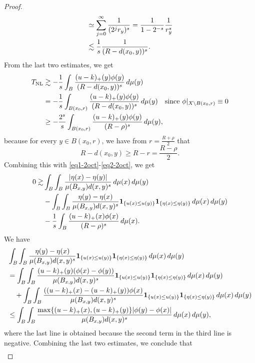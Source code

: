 \documentclass[11pt,leqno]{amsart}
\numberwithin{equation}{section}
\theoremstyle{definition}
\begin{document}
\begin{proof}
\begin{align}
			&\simeq   \sum_{j=0}^\infty \frac{1}{(2^j r_y)^s}= \frac{1}{1-2^{-s}}\frac{1}{r_y^s}\notag\\
			& \lesssim \frac{1}{s}\frac{1}{(R-d(x_0,y))^s}.
		\end{align}
		From the last two estimates, we get
		\begin{align}
			T_{\rm NL}
			&\gtrsim  - \frac{1}{s}\int_{B} \frac{(u-k)_+(y)\phi(y)}{(R-d(x_0,y))^s}\,d\mu(y) \notag\\ 
			&=  - \frac{1}{s}\int_{B(x_0,r)} \frac{(u-k)_+(y)\phi(y)}{(R-d(x_0,y))^s}\,d\mu(y)
			\quad\textrm{since $\phi|_{X\setminus B(x_0,r)}\equiv 0$} \notag\\ 
			& \geq - \frac{2^s}{s}\int_{B(x_0,r)} \frac{(u-k)_+(y)\phi(y)}{(R-\rho)^s}\,d\mu(y), \notag
		\end{align}
		because for every $y\in B(x_0,r)$, we have from  $r=\frac{R+\rho}{2}$ that
		\[
		R-d(x_0,y)\geq R-r = \frac{R-\rho}{2}.
		\]
		Combining this with \eqref{eq1-2oct}-\eqref{eq2-2oct}, we get
		{
			\begin{align*}
				0\gtrsim &  \int_B\int_B \frac{|\eta(x)-\eta(y)| }{\mu(B_{x,y}) d(x,y)^s}  \,d\mu(x)\,d\mu(y)\\
				&-   \int_B\int_B \frac{\eta(y)-\eta(x) }{\mu(B_{x,y}) d(x,y)^s} {\bf 1}_{\{ u(x)\leq u(y)\}} {\bf 1}_{\{\eta(x)\leq \eta(y)\}} \,d\mu(x)\,d\mu(y)\\
				& - \frac{1}{s} \int_{B} \frac{(u-k)_+(x)\phi(x)}{(R-\rho)^s} \,d\mu(x).
			\end{align*}
		}
		We have
		\begin{align*}
			&  \int_B\int_B \frac{\eta(y)-\eta(x) } {\mu(B_{x,y}) d(x,y)^s} {\bf 1}_{\{ u(x)\leq u(y)\}} {\bf 1}_{\{\eta(x)\leq \eta(y)\}} \,d\mu(x)\,d\mu(y)\\
			&=  \int_B\int_B \frac{(u-k)_+(y) (\phi(x)-\phi(y))}{\mu(B_{x,y}) d(x,y)^s} {\bf 1}_{\{ u(x)\leq u(y)\}} {\bf 1}_{\{\eta(x)\leq \eta(y)\}} \,d\mu(x)\,d\mu(y)\\
			&\quad +  \int_B\int_B \frac{((u-k)_+(x) -(u-k)_+(y))\phi(x)}{\mu(B_{x,y}) d(x,y)^s} {\bf 1}_{\{ u(x)\leq u(y)\}} {\bf 1}_{\{\eta(x)\leq \eta(y)\}} \,d\mu(x)\,d\mu(y)\\
			&\leq   \int_B\int_B \frac{\max\{(u-k)_+(x), (u-k)_+(y) \} |\phi(y)-\phi(x)|}{\mu(B_{x,y}) d(x,y)^s}  \,d\mu(x)\,d\mu(y),
		\end{align*}
		where the last line is obtained because the second term in the third line is negative. Combining the last two estimates, we conclude that		
		{
			\begin{align}

\end{align}}
\end{proof}
\end{document}
